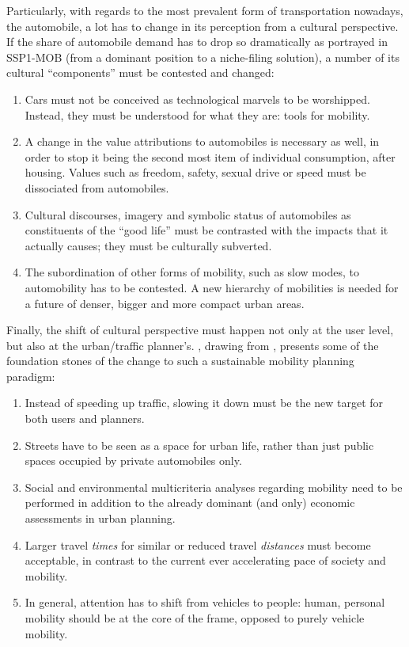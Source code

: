 Particularly, with regards to the most prevalent form of transportation nowadays, the automobile, a lot has to change in its perception from a cultural perspective. If the share of automobile demand has to drop so dramatically as portrayed in SSP1-MOB (from a dominant position to a niche-filing solution), a number of its cultural ``components'' \parencite{urry2004_SystemAutomobility} must be contested and changed:
%
\begin{enumerate}
\item Cars must not be conceived as technological marvels to be worshipped. Instead, they must be understood for what they are: tools for mobility.
\item A change in the value attributions to automobiles is necessary as well, in order to stop it being the second most item of individual consumption, after housing. Values such as freedom, safety, sexual drive or speed must be dissociated from automobiles.
\item Cultural discourses, imagery and symbolic status of automobiles as constituents of the ``good life'' must be contrasted with the impacts that it actually causes; they must be culturally subverted.
\item The subordination of other forms of mobility, such as slow modes, to automobility has to be contested. A new hierarchy of mobilities is needed for a future of denser, bigger and more compact urban areas.
\end{enumerate}

Finally, the shift of cultural perspective must happen not only at the user level, but also at the urban/traffic planner's. \textcite{banister2008_sustainablemobilityparadigm}, drawing from \textcite{marshall2001_challengesustainabletransport}, presents some of the foundation stones of the change to such a sustainable mobility planning paradigm:
%
\begin{enumerate}
\item Instead of speeding up traffic, slowing it down must be the new target for both users and planners.
\item Streets have to be seen as a space for urban life, rather than just public spaces occupied by private automobiles only.
\item Social and environmental multicriteria analyses regarding mobility need to be performed in addition to the already dominant (and only) economic assessments in urban planning.
\item Larger travel \emph{times} for similar or reduced travel \emph{distances} must become acceptable, in contrast to the current ever accelerating pace of society and mobility.
\item In general, attention has to shift from vehicles to people: human, personal mobility should be at the core of the frame, opposed to purely vehicle mobility.
\end{enumerate}

